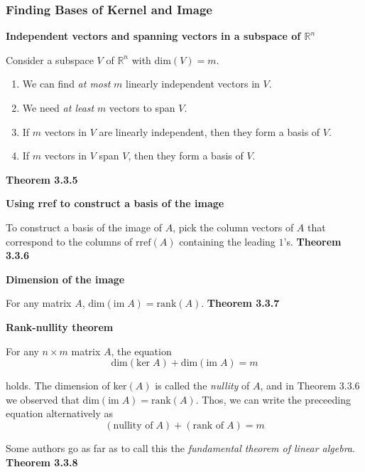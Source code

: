 \subsubsection*{Finding Bases of Kernel and Image}
\par\noindent\textbf{Independent vectors and spanning vectors in a subspace of $\mathbb{R}^{n}$}
\par\noindent Consider a subspace $V$ of $\mathbb{R}^{n}$ with $\textrm{dim}(V)=m$.
\renewcommand{\labelenumi}{\textbf{\alph{enumi}.}}
\begin{enumerate}
\item We can find \textit{at most} $m$ linearly independent vectors in $V$.
\item We need \textit{at least} $m$ vectors to span $V$.
\item If $m$ vectors in $V$ are linearly independent, then they form a basis of $V$.
\item If $m$ vectors in $V$ span $V$, then they form a basis of $V$.
\end{enumerate}
\textbf{Theorem 3.3.5}\\
\par\noindent\textbf{Using rref to construct a basis of the image}
\par\noindent To construct a basis of the image of $A$, pick the column vectors of $A$ that correspond to the columns of $\textrm{rref}(A)$ containing the leading $1$'s.
\textbf{Theorem 3.3.6}\\
\par\noindent\textbf{Dimension of the image}
\par\noindent For any matrix $A$, $\textrm{dim}(\textrm{im}\;{}A)=\textrm{rank}(A)$.
\textbf{Theorem 3.3.7}\\
\par\noindent\textbf{Rank-nullity theorem}
\par\noindent For any $n\times{}m$ matrix $A$, the equation
\[\textrm{dim}(\textrm{ker}\;{}A)+\textrm{dim}(\textrm{im}\;{}A)=m\]
\par\noindent holds. The dimension of $\textrm{ker}(A)$ is called the \textit{nullity} of $A$, and in Theorem 3.3.6 we observed that $\textrm{dim}(\textrm{im}\;{}A)=\textrm{rank}(A)$. Thos, we can write the preceeding equation alternatively as
\[(\textrm{nullity of}\;{}A)+(\textrm{rank of}\;{}A)=m\]
\par\noindent Some authors go as far as to call this the \textit{fundamental theorem of linear algebra}.
\textbf{Theorem 3.3.8}\\

